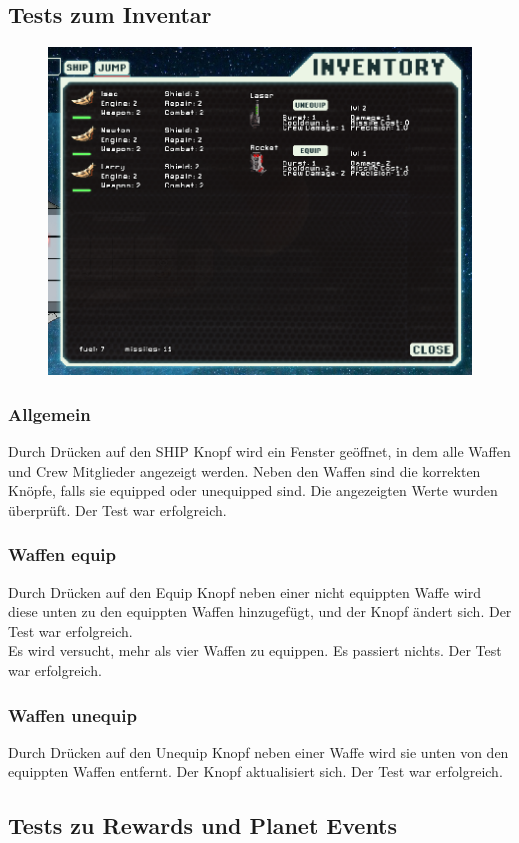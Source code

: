 \documentclass[fontsize=12pt,paper=a4,twoside]{scrartcl}
\begin{document}
\subsection{Tests zum Inventar}
\begin{figure}[h!]
\centering
\includegraphics[width=0.5\linewidth]{images/inventory1.png}
\end{figure}
\subsubsection{Allgemein}
Durch Drücken auf den SHIP Knopf wird ein Fenster geöffnet, in dem alle Waffen und Crew Mitglieder angezeigt werden. Neben den Waffen sind die korrekten Knöpfe, falls sie equipped oder unequipped sind. Die angezeigten Werte wurden überprüft. Der Test war erfolgreich. \\
\subsubsection{Waffen equip}
Durch Drücken auf den Equip Knopf neben einer nicht equippten Waffe wird diese unten zu den equippten Waffen hinzugefügt, und der Knopf ändert sich. Der Test war erfolgreich. \\
Es wird versucht, mehr als vier Waffen zu equippen. Es passiert nichts. Der Test war erfolgreich. \\
\subsubsection{Waffen unequip}
Durch Drücken auf den Unequip Knopf neben einer Waffe wird sie unten von den equippten Waffen entfernt. Der Knopf aktualisiert sich. Der Test war erfolgreich. \\



\subsection{Tests zu Rewards und Planet Events}
\end{document}
